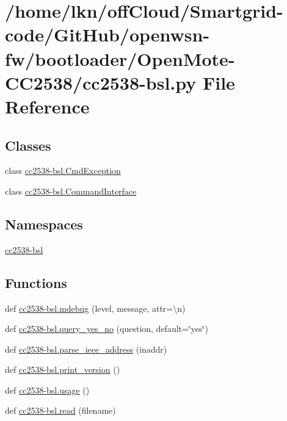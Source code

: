 \hypertarget{cc2538-bsl_8py}{}\section{/home/lkn/off\+Cloud/\+Smartgrid-\/code/\+Git\+Hub/openwsn-\/fw/bootloader/\+Open\+Mote-\/\+C\+C2538/cc2538-\/bsl.py File Reference}
\label{cc2538-bsl_8py}
\subsection*{Classes}
\begin{DoxyCompactItemize}
\item 
class \hyperlink{classcc2538-bsl_1_1_cmd_exception}{cc2538-\/bsl.\+Cmd\+Exception}
\item 
class \hyperlink{classcc2538-bsl_1_1_command_interface}{cc2538-\/bsl.\+Command\+Interface}
\end{DoxyCompactItemize}
\subsection*{Namespaces}
\begin{DoxyCompactItemize}
\item 
 \hyperlink{namespacecc2538-bsl}{cc2538-\/bsl}
\end{DoxyCompactItemize}
\subsection*{Functions}
\begin{DoxyCompactItemize}
\item 
def \hyperlink{namespacecc2538-bsl_aafdb3727bf1279bc721ec38c4d5205a5}{cc2538-\/bsl.\+mdebug} (level, message, attr=\textquotesingle{}\textbackslash{}n\textquotesingle{})
\item 
def \hyperlink{namespacecc2538-bsl_ad1206c0683b83afa74c346bd1fc0ee17}{cc2538-\/bsl.\+query\+\_\+yes\+\_\+no} (question, default=\char`\"{}yes\char`\"{})
\item 
def \hyperlink{namespacecc2538-bsl_ac6c8e3135ca098d1be447e4ba3973159}{cc2538-\/bsl.\+parse\+\_\+ieee\+\_\+address} (inaddr)
\item 
def \hyperlink{namespacecc2538-bsl_aa00f797eaa91b7295ea2e0a3d28eac1a}{cc2538-\/bsl.\+print\+\_\+version} ()
\item 
def \hyperlink{namespacecc2538-bsl_a80cfb11741ed775fdfe90f4fba8955f9}{cc2538-\/bsl.\+usage} ()
\item 
def \hyperlink{namespacecc2538-bsl_a1c6dc3d541387c959e9d61d8a88863fd}{cc2538-\/bsl.\+read} (filename)
\end{DoxyCompactItemize}
